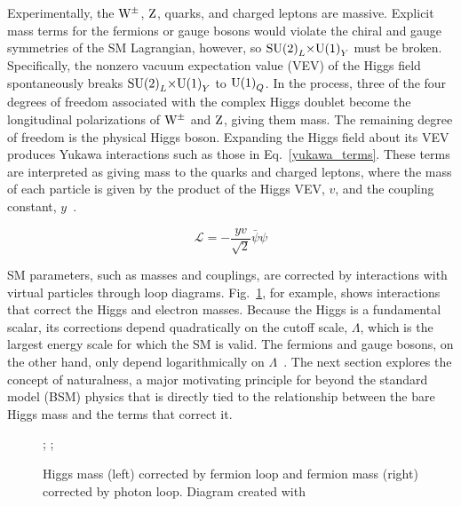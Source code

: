 \documentclass[12pt]{article}
\begin{document}
    Experimentally, the $\mathrm{W}^\pm$, $\mathrm{Z}$, quarks, and charged leptons are massive. Explicit mass terms for the fermions or gauge bosons would violate the chiral and gauge symmetries of the SM Lagrangian, however, so $\mathrm{SU} {{\left(2\right)}}_L {\times} \mathrm{U} {\left(1\right)}_Y$ must be broken. Specifically, the nonzero vacuum expectation value (VEV) of the Higgs field spontaneously breaks $\mathrm{SU} {{\left(2\right)}}_L {\times} \mathrm{U} {\left(1\right)}_Y$ to $\mathrm{U} {\left(1\right)}_Q$. In the process, three of the four degrees of freedom associated with the complex Higgs doublet become the longitudinal polarizations of $\mathrm{W}^\pm$ and $\mathrm{Z}$, giving them mass. The remaining degree of freedom is the physical Higgs boson. Expanding the Higgs field about its VEV produces Yukawa interactions such as those in Eq.~\ref{yukawa_terms}. These terms are interpreted as giving mass to the quarks and charged leptons, where the mass of each particle is given by the product of the Higgs VEV, $v$, and the coupling constant, $y$~\cite{sm_intro}.

    \noindent \begin{equation}
        \mathcal{L} = -\frac{yv}{\sqrt{2}}\bar{\psi}\psi 
        \label{yukawa_terms}
    \end{equation}

    SM parameters, such as masses and couplings, are corrected by interactions with virtual particles through loop diagrams. Fig.~\ref{loop_diagrams}, for example, shows interactions that correct the Higgs and electron masses. Because the Higgs is a fundamental scalar, its corrections depend quadratically on the cutoff scale, $\Lambda$, which is the largest energy scale for which the SM is valid. The fermions and gauge bosons, on the other hand, only depend logarithmically on $\Lambda$~\cite{dine_naturalness}. The next section explores the concept of naturalness, a major motivating principle for beyond the standard model (BSM) physics that is directly tied to the relationship between the bare Higgs mass and the terms that correct it.


    \noindent \begin{figure}[htbp] \begin{center}
        ;
        \qquad
        ;
        \caption{Higgs mass (left) corrected by fermion loop and fermion mass (right) corrected by photon loop. Diagram created with~\cite{tikz}}
        \label{loop_diagrams}
    \end{center} \end{figure}
\end{document}
